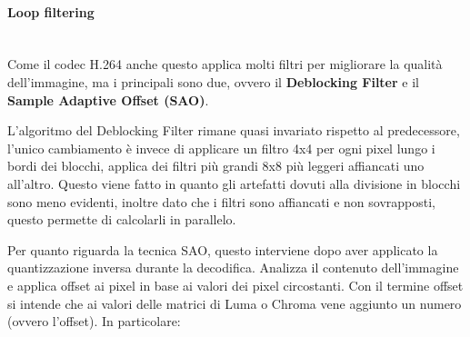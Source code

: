 \documentclass[a4paper,12pt, oneside]{article}
\begin{document}
\paragraph{Loop filtering}\hphantom{A}\\
Come il codec H.264 anche questo applica molti filtri per migliorare la qualità dell'immagine, ma i principali
sono due, ovvero il \textbf{Deblocking Filter} e il \textbf{Sample Adaptive Offset (SAO)}.

L'algoritmo del Deblocking Filter rimane quasi invariato rispetto al predecessore, l'unico cambiamento è invece
di applicare un filtro 4x4 per ogni pixel lungo i bordi dei blocchi, applica dei filtri più grandi 8x8 più
leggeri affiancati uno all'altro. Questo viene fatto in quanto gli artefatti dovuti alla divisione in blocchi
sono meno evidenti, inoltre dato che i filtri sono affiancati e non sovrapposti, questo permette di calcolarli
in parallelo.

Per quanto riguarda la tecnica SAO, questo interviene dopo aver applicato la quantizzazione inversa durante
la decodifica. Analizza il contenuto dell'immagine e applica offset ai pixel in base ai valori dei pixel
circostanti. Con il termine offset si intende che ai valori delle matrici di Luma o Chroma vene aggiunto un
numero (ovvero l'offset).
In particolare:
\end{document}
